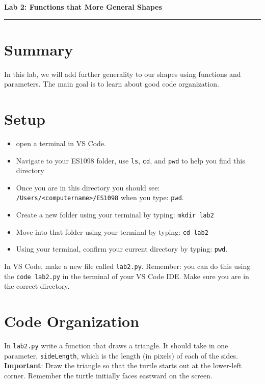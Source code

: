 \documentclass[12pt]{article}
\begin{document}
\begin{center}
  {\Large {\bf Lab 2: Functions that More General Shapes}}
  
\end{center}

\vspace{5pt}
\hrule
\vspace{5pt}

\section{Summary}
In this lab, we will add further generality to our shapes using functions and parameters.
The main goal is to learn about good code organization. 

\section{Setup}
\begin{itemize}
  \item open a terminal in VS Code. 
  \item Navigate to your ES1098 folder, use \texttt{ls}, \texttt{cd}, and \texttt{pwd} to help you find this directory
  \item Once you are in this directory you should see: \texttt{/Users/<computername>/ES1098} when you type: \texttt{pwd}.
  \item Create a new folder using your terminal by typing: \texttt{mkdir lab2}
  \item Move into that folder using your terminal by typing: \texttt{cd lab2}
  \item Using your terminal, confirm your current directory by typing: \texttt{pwd}.
\end{itemize}

In VS Code, make a new file called \texttt{lab2.py}. Remember: you can do this using the \texttt{code lab2.py} in the terminal of your VS Code IDE. Make sure you are in the correct directory. 

\section{Code Organization}
In \texttt{lab2.py} write a function that draws a triangle. It should take in one parameter, \texttt{sideLength}, which is the length (in pixels) of each of the sides. \textbf{Important}: Draw the triangle so that the turtle starts out at the lower-left corner. Remember the turtle initially faces eastward on the screen.
\end{document}

